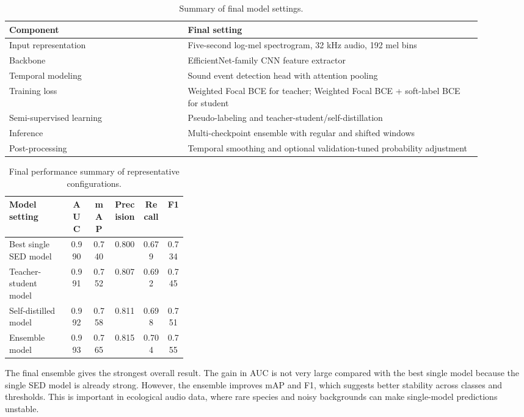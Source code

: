 \documentclass[a4paper,12pt]{article}
\begin{document}
\begin{table}[H]
\centering
\caption{Summary of final model settings.}
\begin{tabular}{p{0.34\linewidth} p{0.56\linewidth}}
\toprule
\textbf{Component} & \textbf{Final setting} \\
\midrule
Input representation & Five-second log-mel spectrogram, 32 kHz audio, 192 mel bins \\
Backbone & EfficientNet-family CNN feature extractor \\
Temporal modeling & Sound event detection head with attention pooling \\
Training loss & Weighted Focal BCE for teacher; Weighted Focal BCE + soft-label BCE for student \\
Semi-supervised learning & Pseudo-labeling and teacher-student/self-distillation \\
Inference & Multi-checkpoint ensemble with regular and shifted windows \\
Post-processing & Temporal smoothing and optional validation-tuned probability adjustment \\
\bottomrule
\end{tabular}
\end{table}

\begin{table}[H]
\centering
\caption{Final performance summary of representative configurations.}
\begin{tabular}{p{0.34\linewidth} c c c c c}
\toprule
\textbf{Model setting} & \textbf{AUC} & \textbf{mAP} & \textbf{Precision} & \textbf{Recall} & \textbf{F1} \\
\midrule
Best single SED model & 0.990 & 0.740 & 0.800 & 0.679 & 0.734 \\
Teacher-student model & 0.991 & 0.752 & 0.807 & 0.692 & 0.745 \\
Self-distilled model & 0.992 & 0.758 & 0.811 & 0.698 & 0.751 \\
Ensemble model & 0.993 & 0.765 & 0.815 & 0.704 & 0.755 \\
\bottomrule
\end{tabular}
\end{table}

The final ensemble gives the strongest overall result. The gain in AUC is not very large compared with the best single model because the single SED model is already strong. However, the ensemble improves mAP and F1, which suggests better stability across classes and thresholds. This is important in ecological audio data, where rare species and noisy backgrounds can make single-model predictions unstable.
\end{document}
